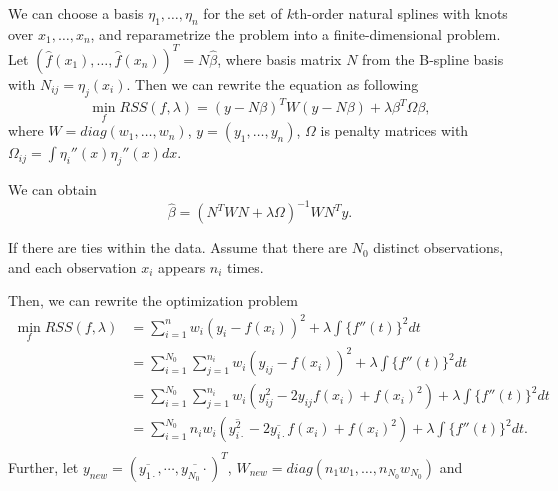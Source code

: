 \begin{solution}
    We can choose a basis $\eta_1, \dots, \eta_n$ for the set of $k$th-order natural splines with knots over $x_1, \dots, x_n$, 
    and reparametrize the problem into a finite-dimensional problem. 
    Let $(\hat{f}(x_1), \dots, \hat{f}(x_n))^T = N \hat{\beta}$, where basis matrix $N$ from the B-spline basis with $N_{ij} = \eta_{j} (x_i)$. 
    Then we can rewrite the equation as following
    \begin{equation*}
        \min_f RSS(f, \lambda) =  (y - N \beta)^T W (y - N \beta)  + \lambda \beta^T \Omega \beta,
    \end{equation*}
    where $W=diag(w_1, \dots, w_n)$, $y=(y_1, \dots, y_n)$, $\Omega$ is penalty matrices with $\Omega_{ij} = \int \eta_i''(x) \eta_j''(x) dx$. 

    We can obtain
    \begin{equation*}
        \hat{\beta} = (N^T W N + \lambda \Omega)^{-1} W N^T y.
    \end{equation*}

    If there are ties within the data. Assume that there are $N_0$ distinct observations, and each observation $x_i$ appears $n_i$ times. 

    Then, we can rewrite the optimization problem
    \begin{equation*}
        \begin{split}
            \min_f RSS(f,\lambda) 
            & = \sum_{i=1}^n w_i (y_i - f(x_i))^2 + \lambda \int \{f''(t)\}^2dt \\
            & = \sum_{i=1}^{N_0} \sum_{j=1}^{n_i} w_i (y_{ij} - f(x_i))^2 + \lambda \int \{f''(t)\}^2dt \\
            & = \sum_{i=1}^{N_0} \sum_{j=1}^{n_i} w_i (y_{ij}^2 - 2 y_{ij} f(x_i) + f(x_i)^2) + \lambda \int \{f''(t)\}^2dt \\
            & = \sum_{i=1}^{N_0} n_i w_i \left( \overline{y_{i\cdot}^2} - 2 \overline{y_{i\cdot}} f(x_i) + f(x_i)^2 \right) + \lambda \int \{f''(t)\}^2dt . \\
        \end{split}
    \end{equation*}
    Further, let $y_{new} = \left(\overline{y_{1\cdot}}, \cdots, \overline{y_{N_0}\cdot} \right)^T$, $W_{new}=diag(n_1 w_1, \dots, n_{N_0} w_{N_0})$ and 
\end{solution}




